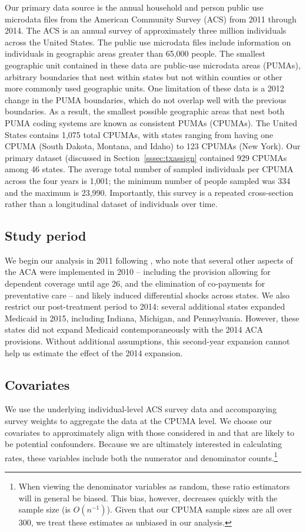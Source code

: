 \documentclass[aoas]{imsart}
\theoremstyle{plain}
\theoremstyle{remark}
\begin{document}
Our primary data source is the annual household and person public use microdata files from the American Community Survey (ACS) from 2011 through 2014. The ACS is an annual survey of approximately three million individuals across the United States. The public use microdata files include information on individuals in geographic areas greater than 65,000 people. The smallest geographic unit contained in these data are public-use microdata areas (PUMAs), arbitrary boundaries that nest within states but not within counties or other more commonly used geographic units. One limitation of these data is a 2012 change in the PUMA boundaries, which do not overlap well with the previous boundaries. As a result, the smallest possible geographic areas that nest both PUMA coding systems are known as consistent PUMAs (CPUMAs). The United States contains 1,075 total CPUMAs, with states ranging from having one CPUMA (South Dakota, Montana, and Idaho) to 123 CPUMAs (New York). Our primary dataset (discussed in Section~\ref{sssec:txassign} contained 929 CPUMAs among 46 states. The average total number of sampled individuals per CPUMA across the four years is 1,001; the minimum number of people sampled was 334 and the maximum is 23,990. Importantly, this survey is a repeated cross-section rather than a longitudinal dataset of individuals over time.

\subsection{Study period}

We begin our analysis in 2011 following \cite{courtemanche2017early}, who note that several other aspects of the ACA were implemented in 2010 -- including the provision allowing for dependent coverage until age 26, and the elimination of co-payments for preventative care -- and likely induced differential shocks across states. We also restrict our post-treatment period to 2014: several additional states expanded Medicaid in 2015, including Indiana, Michigan, and Pennsylvania. However, these states did not expand Medicaid contemporaneously with the 2014 ACA provisions. Without additional assumptions, this second-year expansion cannot help us estimate the effect of the 2014 expansion. 

\subsection{Covariates}

We use the underlying individual-level ACS survey data and accompanying survey weights to aggregate the data at the CPUMA level. We choose our covariates to approximately align with those considered in \cite{courtemanche2017early} and that are likely to be potential confounders. Because we are ultimately interested in calculating rates, these variables include both the numerator and denominator counts.\footnote{When viewing the denominator variables as random, these ratio estimators will in general be biased. This bias, however, decreases quickly with the sample size (is $O(n^{-1})$). Given that our CPUMA sample sizes are all over 300, we treat these estimates as unbiased in our analysis.}
\end{document}
